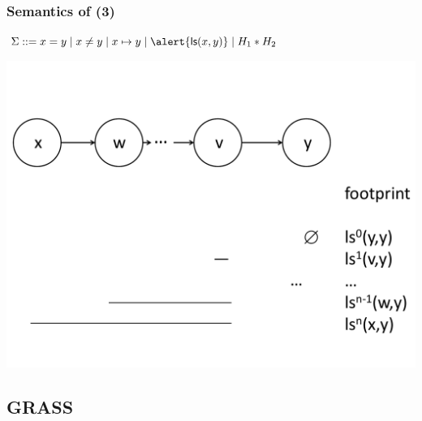 \documentclass{beamer}
\begin{document}
\begin{frame}
  \frametitle{Semantics of \JoshLogic (3)}
  $\Sigma ::= x = y \mid x \neq y \mid x \mapsto y \mid \alert{\liste{x}{y}} \mid H_1 * H_2$

\begin{center}
\includegraphics[scale=0.35]{resources/sl_lst.pdf}
\end{center}

\end{frame}

\subsection{GRASS}
\end{document}

